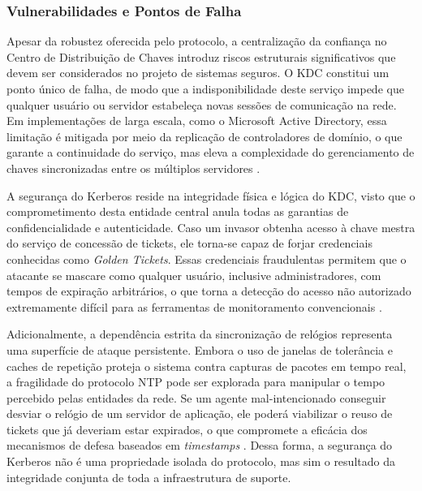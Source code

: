 \subsubsection{Vulnerabilidades e Pontos de Falha}

Apesar da robustez oferecida pelo protocolo, a centralização da confiança no Centro de Distribuição de Chaves introduz riscos estruturais significativos que devem ser considerados no projeto de sistemas seguros. O KDC constitui um ponto único de falha, de modo que a indisponibilidade deste serviço impede que qualquer usuário ou servidor estabeleça novas sessões de comunicação na rede. Em implementações de larga escala, como o Microsoft Active Directory, essa limitação é mitigada por meio da replicação de controladores de domínio, o que garante a continuidade do serviço, mas eleva a complexidade do gerenciamento de chaves sincronizadas entre os múltiplos servidores \cite{tanenbaum2017}.

A segurança do Kerberos reside na integridade física e lógica do KDC, visto que o comprometimento desta entidade central anula todas as garantias de confidencialidade e autenticidade. Caso um invasor obtenha acesso à chave mestra do serviço de concessão de tickets, ele torna-se capaz de forjar credenciais conhecidas como \textit{Golden Tickets}. Essas credenciais fraudulentas permitem que o atacante se mascare como qualquer usuário, inclusive administradores, com tempos de expiração arbitrários, o que torna a detecção do acesso não autorizado extremamente difícil para as ferramentas de monitoramento convencionais \cite{neuman1994}.

Adicionalmente, a dependência estrita da sincronização de relógios representa uma superfície de ataque persistente. Embora o uso de janelas de tolerância e caches de repetição proteja o sistema contra capturas de pacotes em tempo real, a fragilidade do protocolo NTP pode ser explorada para manipular o tempo percebido pelas entidades da rede. Se um agente mal-intencionado conseguir desviar o relógio de um servidor de aplicação, ele poderá viabilizar o reuso de tickets que já deveriam estar expirados, o que compromete a eficácia dos mecanismos de defesa baseados em \textit{timestamps} \cite{coulouris2013}. Dessa forma, a segurança do Kerberos não é uma propriedade isolada do protocolo, mas sim o resultado da integridade conjunta de toda a infraestrutura de suporte.